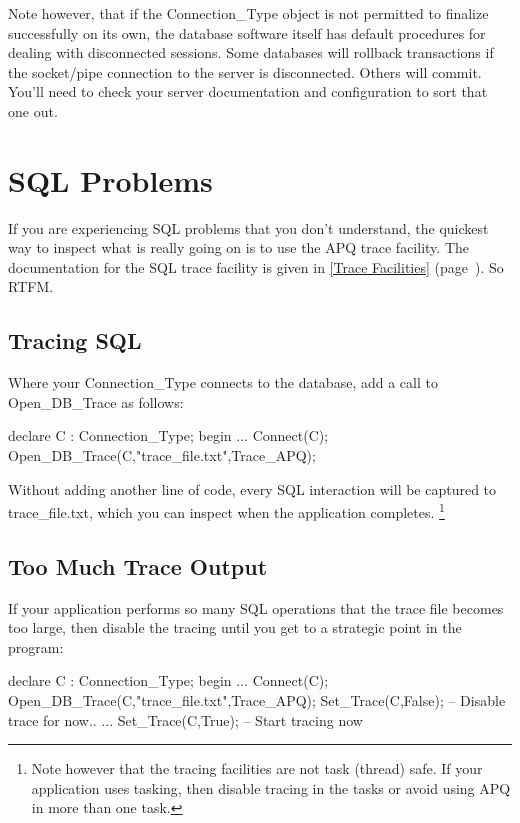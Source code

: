 \documentclass[english,letterpaper]{book}
\newcommand\Ref[1]{\textsection\ref{#1} (page~\pageref{#1})}
\begin{document}
Note however, that if the Connection\_Type object is not permitted
to finalize successfully on its own, the database software itself
has default procedures for dealing with disconnected sessions. Some
databases will rollback transactions if the socket/pipe connection
to the server is disconnected. Others will commit. You'll need to
check your server documentation and configuration to sort that one
out.


\section{SQL Problems\label{SQL Problems}}

If you are experiencing SQL problems that you don't understand, the
quickest way to inspect what is really going on is to use the APQ
trace facility. The documentation for the SQL trace facility is given
in \Ref{Trace Facilities}. So RTFM.


\subsection{Tracing SQL}

Where your Connection\_Type connects to the database, add a call to
Open\_DB\_Trace as follows:

\begin{Example}
declare
   C : Connection_Type;
begin
   ...
   Connect(C);
   Open_DB_Trace(C,"trace_file.txt",Trace_APQ);
\end{Example}

Without adding another line of code, every SQL interaction will be
captured to trace\_file.txt, which you can inspect when the application
completes.%
\footnote{Note however that the tracing facilities are not task (thread) safe.
If your application uses tasking, then disable tracing in the tasks
or avoid using APQ in more than one task.%
}


\subsection{Too Much Trace Output}

If your application performs so many SQL operations that the trace
file becomes too large, then disable the tracing until you get to
a strategic point in the program:

\begin{Example}
declare
   C : Connection_Type;
begin
   ...
   Connect(C);
   Open_DB_Trace(C,"trace_file.txt",Trace_APQ);
   Set_Trace(C,False);  -- Disable trace for now..
   ...
   Set_Trace(C,True);   -- Start tracing now
\end{Example}
\end{document}
